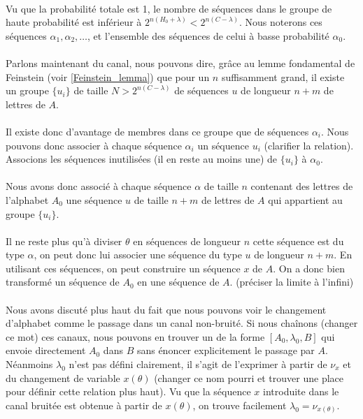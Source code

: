 	\paragraph{}
	Vu que la probabilité totale est 1, le nombre de séquences dans le groupe de haute probabilité est inférieur à $2^{n(H_0+\lambda)}<2^{n(C-\lambda)}$.
	Nous noterons ces séquences $\alpha_1,\alpha_2,\dots$, et l'ensemble des séquences de celui à basse probabilité $\alpha_0$.
	
	\paragraph{}
	Parlons maintenant du canal, nous pouvons dire, grâce au lemme fondamental de Feinstein (voir \ref{Feinstein_lemma}) 
	que pour un $n$ suffisamment grand, il existe un groupe $\{u_i\}$ de taille $N > 2^{n(C-\lambda)}$ de séquences $u$ de longueur $n+m$ de lettres 
	de $A$.
	
	\paragraph{}
	Il existe donc d'avantage de membres dans ce groupe que de séquences $\alpha_i$. Nous pouvons donc associer à chaque séquence $\alpha_i$
	un séquence $u_i$ (clarifier la relation). Associons les séquences inutilisées (il en reste au moins une) de $\{u_i\}$ à $\alpha_0$.
	
	\paragraph{}
	Nous avons donc associé à chaque séquence $\alpha$ de taille $n$ contenant des lettres de l'alphabet $A_0$ une séquence $u$ de taille $n+m$ de
	lettres de $A$ qui appartient au groupe $\{u_i\}$. 
	
	\paragraph{}
	Il ne reste plus qu'à diviser $\theta$ en séquences de longueur $n$ cette séquence est du type $\alpha$, on peut donc lui 
	associer une séquence du type $u$ de longueur $n+m$. En utilisant ces séquences, on peut construire un séquence $x$ de $A$. On a donc bien transformé
	un séquence de $A_0$ en une séquence de $A$. (préciser la limite à l'infini)
	
	\paragraph{}Nous avons discuté plus haut du fait que nous pouvons voir le changement d'alphabet comme le passage dans un canal non-bruité. 
	Si nous chaînons (changer ce mot) ces canaux, nous pouvons en trouver un de la forme $[A_0,\lambda_0,B]$ qui envoie directement $A_0$ dans $B$ 
	sans énoncer explicitement le passage par $A$. Néanmoins $\lambda_0$ n'est pas défini clairement, il s'agit de l'exprimer à partir de $\nu_x$ et
	du changement de variable $x(\theta)$ (changer ce nom pourri et trouver une place pour définir cette relation plus haut). 
	Vu que la séquence $x$ introduite dans le canal bruitée est obtenue à partir de $x(\theta)$, on trouve facilement $\lambda_0=\nu_{x(\theta)}$.
	
